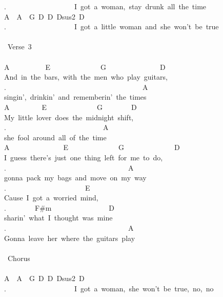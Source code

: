 {.\ \ \ \ \ \ \ \ \ \ \ \ \ \ \ \ \ \ \ I\ got\ a\ woman,\ stay\ drunk\ all\ the\ time\\
A\ \ A\ \ G\ D\ D\ Dsus2\ D\ \ \ \ \ \ \ \ \ \ \ \ \ \ \ \\
.\ \ \ \ \ \ \ \ \ \ \ \ \ \ \ \ \ \ \ I\ got\ a\ little\ woman\ and\ she\ won't\ be\ true\\
\\
\lbrack\ Verse\ 3\rbrack\\
\\
A\ \ \ \ \ \ \ \ \ \ E\ \ \ \ \ \ \ \ \ \ \ \ \ \ G\ \ \ \ \ \ \ \ \ \ \ \ \ \ \ D\\
And\ in\ the\ bars,\ with\ the\ men\ who\ play\ guitars,\\
.\ \ \ \ \ \ \ \ \ \ \ \ \ \ \ \ \ \ \ \ \ \ \ \ \ \ \ \ \ \ \ \ \ \ \ \ \ \ A\\
singin',\ drinkin'\ and\ rememberin'\ the\ times\\
A\ \ \ \ \ \ \ \ \ E\ \ \ \ \ \ \ \ \ \ \ \ \ \ G\ \ \ \ \ \ \ \ D\\
My\ little\ lover\ does\ the\ midnight\ shift,\\
.\ \ \ \ \ \ \ \ \ \ \ \ \ \ \ \ \ \ \ \ \ \ \ \ \ \ \ A\\
she\ fool\ around\ all\ of\ the\ time\\
A\ \ \ \ \ \ \ \ \ \ \ \ \ \ \ E\ \ \ \ \ \ \ \ \ \ \ \ \ \ G\ \ \ \ \ \ \ \ \ \ \ \ \ \ D\\
I\ guess\ there's\ just\ one\ thing\ left\ for\ me\ to\ do,\\
.\ \ \ \ \ \ \ \ \ \ \ \ \ \ \ \ \ \ \ \ \ \ \ \ \ \ \ \ \ \ \ \ \ \ A\\
gonna\ pack\ my\ bags\ and\ move\ on\ my\ way\\
.\ \ \ \ \ \ \ \ \ \ \ \ \ \ \ \ \ \ \ \ \ \ E\\
Cause\ I\ got\ a\ worried\ mind,\\
.\ \ \ \ \ \ \ \ F\#m\ \ \ \ \ \ \ \ \ \ \ \ \ \ \ \ D\\
sharin'\ what\ I\ thought\ was\ mine\\
.\ \ \ \ \ \ \ \ \ \ \ \ \ \ \ \ \ \ \ \ \ \ \ \ \ \ \ \ \ \ \ \ \ \ A\\
Gonna\ leave\ her\ where\ the\ guitars\ play\\
\\
\lbrack\ Chorus\rbrack\\
\\
A\ \ A\ \ G\ D\ D\ Dsus2\ D\ \ \ \ \ \ \ \ \ \ \ \ \ \ \ \\
.\ \ \ \ \ \ \ \ \ \ \ \ \ \ \ \ \ \ \ I\ got\ a\ woman,\ she\ won't\ be\ true,\ no,\ no\\
}
